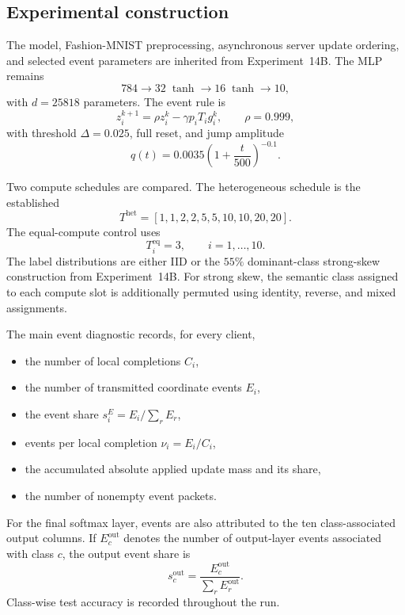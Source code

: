 \subsection{Experimental construction}

The model, Fashion-MNIST preprocessing, asynchronous server update ordering, and selected event parameters are inherited from Experiment~14B. The MLP remains
\begin{equation}
784\rightarrow32\;\tanh\rightarrow16\;\tanh\rightarrow10,
\end{equation}
with $d=25818$ parameters. The event rule is
\begin{equation}
z_i^{k+1}=\rho z_i^k-\gamma p_iT_i g_i^k,
\qquad
\rho=0.999,
\end{equation}
with threshold $\Delta=0.025$, full reset, and jump amplitude
\begin{equation}
q(t)=0.0035\left(1+\frac{t}{500}\right)^{-0.1}.
\end{equation}

Two compute schedules are compared. The heterogeneous schedule is the established
\begin{equation}
T^{\mathrm{het}}=[1,1,2,2,5,5,10,10,20,20].
\end{equation}
The equal-compute control uses
\begin{equation}
T_i^{\mathrm{eq}}=3,\qquad i=1,\ldots,10.
\end{equation}
The label distributions are either IID or the $55\%$ dominant-class strong-skew construction from Experiment~14B. For strong skew, the semantic class assigned to each compute slot is additionally permuted using identity, reverse, and mixed assignments.

The main event diagnostic records, for every client,
\begin{itemize}
    \item the number of local completions $C_i$,
    \item the number of transmitted coordinate events $E_i$,
    \item the event share $s_i^{E}=E_i/\sum_r E_r$,
    \item events per local completion $\nu_i=E_i/C_i$,
    \item the accumulated absolute applied update mass and its share,
    \item the number of nonempty event packets.
\end{itemize}
For the final softmax layer, events are also attributed to the ten class-associated output columns. If $E_c^{\mathrm{out}}$ denotes the number of output-layer events associated with class $c$, the output event share is
\begin{equation}
s_c^{\mathrm{out}}
=\frac{E_c^{\mathrm{out}}}{\sum_r E_r^{\mathrm{out}}}.
\end{equation}
Class-wise test accuracy is recorded throughout the run.

